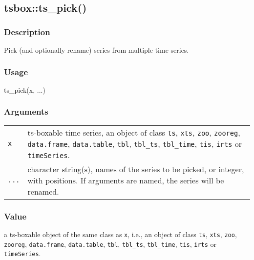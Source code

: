 \documentclass[
  letterpaper,
  DIV=11,
  numbers=noendperiod]{scrreport}
\newenvironment{Shaded}{\begin{snugshade}}{\end{snugshade}}
\newcommand{\FunctionTok}[1]{\textcolor[rgb]{0.28,0.35,0.67}{#1}}
\newcommand{\NormalTok}[1]{\textcolor[rgb]{0.00,0.23,0.31}{#1}}
\begin{document}
\subsection{tsbox::ts\_pick()}\label{tsboxts_pick}

\subsubsection{Description}\label{description-57}

Pick (and optionally rename) series from multiple time series.

\subsubsection{Usage}\label{usage-57}

\begin{Shaded}
\begin{Highlighting}[]
\FunctionTok{ts\_pick}\NormalTok{(x, ...)}
\end{Highlighting}
\end{Shaded}

\subsubsection{Arguments}\label{arguments-57}

\begin{longtable}[]{@{}ll@{}}
\toprule\noalign{}
\endhead
\bottomrule\noalign{}
\endlastfoot
\texttt{x} & ts-boxable time series, an object of class \texttt{ts},
\texttt{xts}, \texttt{zoo}, \texttt{zooreg}, \texttt{data.frame},
\texttt{data.table}, \texttt{tbl}, \texttt{tbl\_ts}, \texttt{tbl\_time},
\texttt{tis}, \texttt{irts} or \texttt{timeSeries}. \\
\texttt{...} & character string(s), names of the series to be picked, or
integer, with positions. If arguments are named, the series will be
renamed. \\
\end{longtable}

\subsubsection{Value}\label{value-57}

a ts-boxable object of the same class as \texttt{x}, i.e., an object of
class \texttt{ts}, \texttt{xts}, \texttt{zoo}, \texttt{zooreg},
\texttt{data.frame}, \texttt{data.table}, \texttt{tbl},
\texttt{tbl\_ts}, \texttt{tbl\_time}, \texttt{tis}, \texttt{irts} or
\texttt{timeSeries}.
\end{document}
